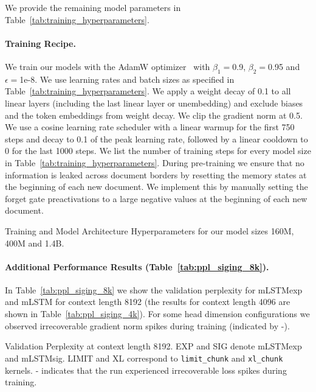 \documentclass{article}
\begin{document}
    We provide the remaining model parameters in Table~\ref{tab:training_hyperparameters}.

    \paragraph{Training Recipe.}
    We train our models with the AdamW optimizer~\citep{loshchilov:18adamw} with $\beta_1=$0.9, $\beta_2=$0.95 and $\epsilon=$1e-8.
    We use learning rates and batch sizes as specified in Table~\ref{tab:training_hyperparameters}.
    We apply a weight decay of 0.1 to all linear layers (including the last linear layer or unembedding) and exclude biases and the token embeddings from weight decay.
    We clip the gradient norm at 0.5.
    We use a cosine learning rate scheduler with a linear warmup for the first 750 steps and decay to 0.1 of the peak learning rate, followed by a linear cooldown to 0 for the last 1000 steps. We list the number of training steps for every model size in Table~\ref{tab:training_hyperparameters}.
    During pre-training we ensure that no information is leaked across document borders by resetting the memory states at the beginning of each new document.
    We implement this by manually setting the forget gate preactivations to a large negative values at the beginning of each new document.
    \begin{table}[htbp]
        \centering
        \caption{Training and Model Architecture Hyperparameters for our model sizes 160M, 400M and 1.4B.}
        \vspace{0.2cm}
        \begin{adjustbox}{width=0.9\textwidth}
                
        \end{adjustbox}
        \label{tab:training_hyperparameters}
    \end{table}

    \paragraph{Additional Performance Results (Table~\ref{tab:ppl_siging_8k}).}
    In Table~\ref{tab:ppl_siging_8k} we show the validation perplexity for mLSTMexp and mLSTM for context length 8192 (the results for context length 4096 are shown in Table~\ref{tab:ppl_siging_4k}).
    For some head dimension configurations we observed irrecoverable gradient norm spikes during training (indicated by -).
    \begin{table}[htbp]
        \centering
        \caption{Validation Perplexity at {context length 8192}. \textsc{EXP} and \textsc{SIG} denote mLSTMexp and mLSTMsig. \textsc{LIMIT} and \textsc{XL} correspond to \texttt{limit\_chunk} and \texttt{xl\_chunk} kernels. - indicates that the run experienced irrecoverable loss spikes during training.}
        \vspace{0.2cm}
        \begin{adjustbox}{width=0.6\textwidth}
                
        \end{adjustbox}
        \label{tab:ppl_siging_8k}
    \end{table}
\end{document}
